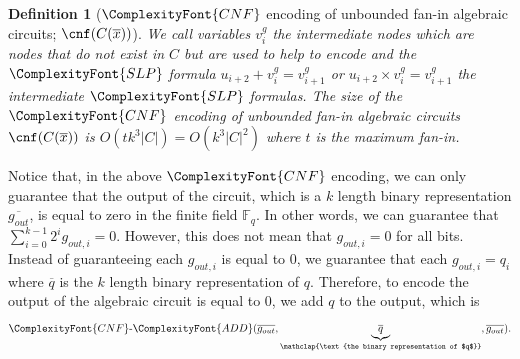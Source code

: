 \documentclass[11pt,letter]{article}
\newtheorem{definition}[theorem]{Definition}
\theoremstyle{remark} %
\newcommand{\CNF}{ %
    {
        \ComplexityFont{CNF}
    }
}
\newcommand{\add}{ %
    {
        \ComplexityFont{ADD}
    }
}
\newcommand{\SLP}{ %
    {
        \ComplexityFont{SLP}
    }
}
\begin{document}
{\begin{definition}[$\CNF$ encoding of unbounded fan-in algebraic circuits; $\cnf(C(\overline{x}))$]
        We call variables $v_i^g$ the \emph{intermediate nodes} which are nodes that do not exist in $C$ but are used to help to encode and the $\SLP$ formula $u_{i+2} + v_{i}^g = v_{i+1}^g$ or $u_{i+2} \times v_{i}^g = v_{i+1}^g$ the \emph{intermediate $\SLP$ formulas}. The size of the $\CNF$ encoding of unbounded fan-in algebraic circuits $\cnf(C(\overline{x}))$ is $O(tk^3|C|)=O(k^3|C|^2)$ where $t$ is the maximum fan-in.
    \end{definition}
    Notice that, in the above $\CNF$ encoding, we can only guarantee that the output of the circuit, which is a $k$ length binary representation $\overline{g_{out}}$, is equal to zero in the finite field $\mathbb{F}_q$. In other words, we can guarantee that $\sum_{i=0}^{k-1} 2^i g_{out,i} =0$. However, this does not mean that $g_{out,i}=0$ for all bits. Instead of guaranteeing each $g_{out,i}$ is equal to $0$, we guarantee that each $g_{out,i}=q_i$ where $\overline{q}$ is the $k$ length binary representation of $q$. Therefore, to encode the output of the algebraic circuit is equal to $0$, we add $q$ to the output, which is 
    \begin{equation*}
        \CNF\text{-}\add(\overline{g_{out}}, \underbrace{\overline{q}}_{\mathclap{\text{the binary representation of $q$}}}, \overline{g_{out}}).
    \end{equation*}

}
\end{document}
